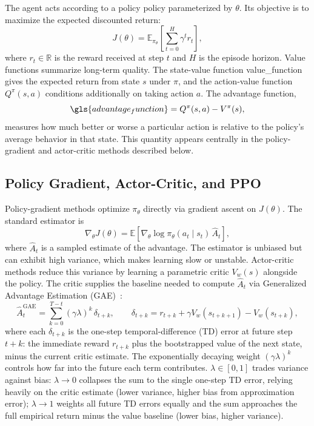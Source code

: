 The agent acts according to a policy \gls{policy} parameterized by $\theta$.
Its objective is to maximize the expected discounted return:
%
\begin{equation}
    J(\theta) = \mathbb{E}_{\pi_\theta}\!\left[\sum_{t=0}^{H} \gamma^t
    r_t\right],
\end{equation}
%
where $r_t \in \mathbb{R}$ is the reward received at step $t$ and $H$ is the
episode horizon.  Value functions summarize long-term quality.  The state-value function
\gls{value_function} gives the expected return from state $s$ under $\pi$, and the
action-value function $Q^\pi(s,a)$ conditions additionally on taking action
$a$.  The advantage function,
%
\begin{equation}
    \gls{advantage_function} = Q^\pi(s,a) - V^\pi(s),
\end{equation}
%
measures how much better or worse a particular action is relative to the
policy's average behavior in that state.  This quantity appears centrally in
the policy-gradient and actor-critic methods described below.

\subsection{Policy Gradient, Actor-Critic, and PPO}

Policy-gradient methods optimize $\pi_\theta$ directly via gradient ascent on
$J(\theta)$.  The standard estimator is
%
\begin{equation}
    \nabla_\theta J(\theta) =
    \mathbb{E}\!\left[
        \nabla_\theta \log \pi_\theta(a_t \mid s_t)\,\hat{A}_t
    \right],
    \label{eq:pg}
\end{equation}
%
where $\hat{A}_t$ is a sampled estimate of the advantage.  The estimator is
unbiased but can exhibit high variance, which makes learning slow or unstable.
Actor-critic methods reduce this variance by learning a parametric critic
$V_w(s)$ alongside the policy.  The critic supplies the baseline needed to
compute $\hat{A}_t$ via Generalized Advantage Estimation
(GAE)~\cite{schulman2015gae}:
%
\begin{equation}
    \hat{A}_t^{\mathrm{GAE}} = \sum_{k=0}^{T-t}(\gamma\lambda)^k\,\delta_{t+k},
    \qquad
    \delta_{t+k} = r_{t+k} + \gamma V_w(s_{t+k+1}) - V_w(s_{t+k}),
    \label{eq:gae}
\end{equation}
%
where each $\delta_{t+k}$ is the one-step temporal-difference (TD) error at
future step $t+k$: the immediate reward $r_{t+k}$ plus the bootstrapped value
of the next state, minus the current critic estimate.  The exponentially
decaying weight $(\gamma\lambda)^k$ controls how far into the future each
term contributes.  $\lambda \in [0,1]$ trades variance against bias:
$\lambda \to 0$ collapses the sum to the single one-step TD error, relying
heavily on the critic estimate (lower variance, higher bias from approximation
error); $\lambda \to 1$ weights all future TD errors equally and the sum
approaches the full empirical return minus the value baseline (lower bias,
higher variance).

